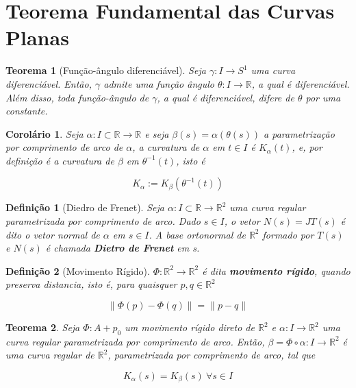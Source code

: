 \documentclass{article}
\newtheorem{theorem}{Teorema}
\newtheorem{corollary}{Corolário}[theorem]
\newtheorem{definition}{Definição}
\begin{document}
\section*{Teorema Fundamental das Curvas Planas}
\label{s4}

\begin{theorem}[Função-ângulo diferenciável]
Seja $\gamma: I \rightarrow S^1$ uma curva diferenciável. Então, $\gamma$ admite uma função ângulo $\theta: I \rightarrow \mathbb{R}$, a qual é diferenciável. Além disso, toda função-ângulo de $\gamma$, a qual é diferenciável, difere de $\theta$ por uma constante.
\end{theorem}

\begin{corollary}
Seja $\alpha : I \subset \mathbb{R} \rightarrow \mathbb{R}$ e seja $\beta(s) = \alpha(\theta(s))$ a parametrização por comprimento de arco de $\alpha$, a curvatura de $\alpha$ em $t \in I$ é $K_\alpha(t)$, e, por definição é a curvatura de $\beta$ em $\theta^{-1}(t)$, isto é

$$K_\alpha := K_\beta(\theta^{-1}(t))$$
\end{corollary}

\begin{definition}[Diedro de Frenet]
Seja $\alpha: I \subset \mathbb{R} \rightarrow \mathbb{R}^2$ uma curva regular parametrizada por comprimento de arco. Dado $s \in I$, o vetor $N(s) = JT(s)$ é dito o vetor normal de $\alpha$ em $s \in I$. A base ortonormal de $\mathbb{R}^2$ formado por $T(s)$ e $N(s)$ é chamada \textbf{Dietro de Frenet} em s.
\end{definition}

\begin{definition}[Movimento Rígido]
$\Phi: \mathbb{R}^2 \rightarrow \mathbb{R}^2$ é dita \textbf{movimento rígido}, quando preserva distancia, isto é, para quaisquer $p, q \in \mathbb{R}^2$

$$\| \Phi(p) - \Phi(q) \| = \| p - q \|$$
\end{definition}

\begin{theorem}
Seja $\Phi: A + p_0$ um movimento rígido direto de $\mathbb{R}^2$ e $\alpha: I \rightarrow \mathbb{R}^2$ uma curva regular parametrizada por comprimento de arco. Então, $\beta = \Phi \circ \alpha: I \rightarrow \mathbb{R}^2$ é uma curva regular de $\mathbb{R}^2$, parametrizada por comprimento de arco, tal que

$$K_\alpha(s) = K_\beta(s) \ \forall s \in I$$
\end{theorem}
\end{document}
